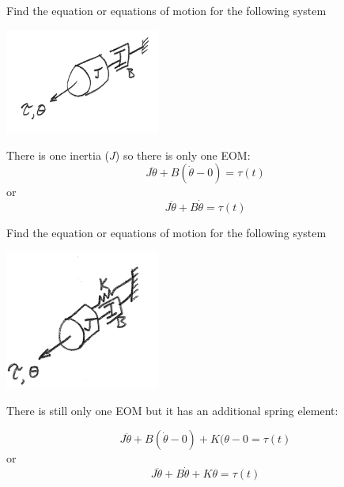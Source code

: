 \begin{ExampleSmall}
Find the equation or equations of motion for the following system

\includegraphics[width=2.0in]{figs03/00741a.png}

There is one inertia ($J$) so there is only one EOM:
\[
J\ddot{\theta} + B(\dot{\theta}-0) = \tau(t)
\]
or
\[
J\ddot{\theta} + B\dot{\theta} = \tau(t)
\]
\end{ExampleSmall}


\begin{ExampleSmall}
Find the equation or equations of motion for the following system

\includegraphics[width=2.0in]{figs03/00742a.png}

There is still only one EOM but it has an additional spring element:

\[
J\ddot{\theta} + B(\dot{\theta}-0) + K(\theta-0 = \tau(t)
\]
or
\[
J\ddot{\theta} + B\dot{\theta} + K\theta = \tau(t)
\]

\end{ExampleSmall}


